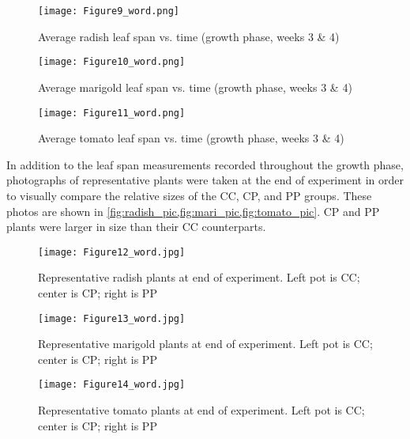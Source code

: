 \begin{figure}[htbp]
  \centering
  \texttt{[image: Figure9\_word.png]}
  \caption{Average radish leaf span vs. time (growth phase, weeks 3 \& 4)}
  \label{fig:radish_span}
\end{figure}

\begin{figure}[htbp]
  \centering
  \texttt{[image: Figure10\_word.png]}
  \caption{Average marigold leaf span vs. time (growth phase, weeks 3 \& 4)}
  \label{fig:marigold_span}
\end{figure}

\begin{figure}[htbp]
  \centering
  \texttt{[image: Figure11\_word.png]}
  \caption{Average tomato leaf span vs. time (growth phase, weeks 3 \& 4)}
  \label{fig:tomato_span}
\end{figure}

In addition to the leaf span measurements recorded throughout the growth phase, photographs of representative plants were taken at the end of experiment in order to visually compare the relative sizes of the CC, CP, and PP groups.  These photos are shown in \cref{fig:radish_pic,fig:mari_pic,fig:tomato_pic}. CP and PP plants were larger in size than their CC counterparts.

\begin{figure}[htbp]
  \centering
  \texttt{[image: Figure12\_word.jpg]}
  \caption{Representative radish plants at end of experiment. Left pot is CC; center is CP; right is PP}
  \label{fig:radish_pic}
\end{figure}

\begin{figure}[htbp]
  \centering
  \texttt{[image: Figure13\_word.jpg]}
  \caption{Representative marigold plants at end of experiment. Left pot is CC; center is CP; right is PP}
  \label{fig:mari_pic}
\end{figure}

\begin{figure}[htbp]
  \centering
  \texttt{[image: Figure14\_word.jpg]}
  \caption{Representative tomato plants at end of experiment. Left pot is CC; center is CP; right is PP}
  \label{fig:tomato_pic}
\end{figure}

